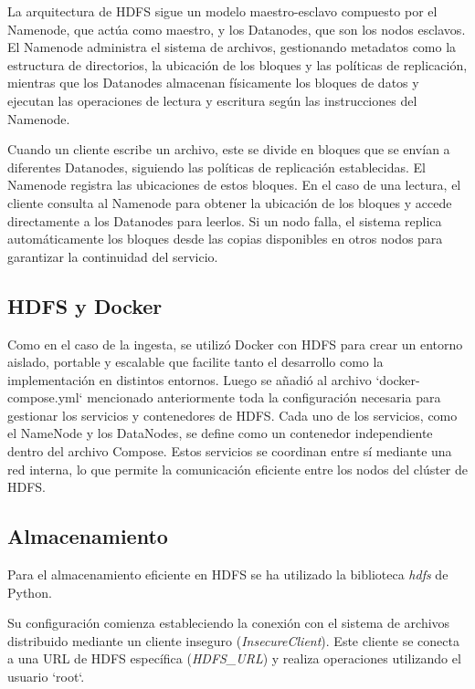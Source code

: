 \documentclass{article}
\begin{document}
La arquitectura de HDFS sigue un modelo maestro-esclavo compuesto por el Namenode, que actúa como maestro, y los Datanodes, que son los nodos esclavos. El Namenode administra el sistema de archivos, gestionando metadatos como la estructura de directorios, la ubicación de los bloques y las políticas de replicación, mientras que los Datanodes almacenan físicamente los bloques de datos y ejecutan las operaciones de lectura y escritura según las instrucciones del Namenode.

Cuando un cliente escribe un archivo, este se divide en bloques que se envían a diferentes Datanodes, siguiendo las políticas de replicación establecidas. El Namenode registra las ubicaciones de estos bloques. En el caso de una lectura, el cliente consulta al Namenode para obtener la ubicación de los bloques y accede directamente a los Datanodes para leerlos. Si un nodo falla, el sistema replica automáticamente los bloques desde las copias disponibles en otros nodos para garantizar la continuidad del servicio.

\subsection{HDFS y Docker}

Como en el caso de la ingesta, se utilizó Docker con HDFS para crear un entorno aislado, portable y escalable que facilite tanto el desarrollo como la implementación en distintos entornos.
Luego se añadió al archivo `docker-compose.yml` mencionado anteriormente toda la configuración necesaria para gestionar los servicios y contenedores de HDFS.
Cada uno de los servicios, como el NameNode y los DataNodes, se define como un contenedor independiente dentro del archivo Compose. Estos servicios se coordinan entre sí mediante una red interna, lo que permite la comunicación eficiente entre los nodos del clúster de HDFS.

\subsection{Almacenamiento}

Para el almacenamiento eficiente en HDFS se ha utilizado la biblioteca \textit{hdfs} de Python.

Su configuración comienza estableciendo la conexión con el sistema de archivos distribuido mediante un cliente inseguro (\textit{InsecureClient}). Este cliente se conecta a una URL de HDFS específica (\textit{HDFS\_URL}) y realiza operaciones utilizando el usuario `root`.
\end{document}
